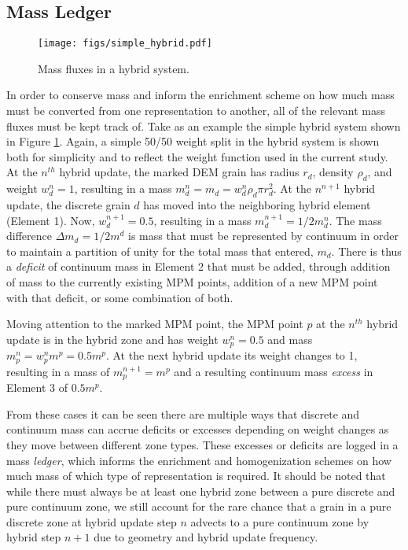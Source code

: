 \subsection{Mass Ledger}

\begin{figure}[htp] 
    \centering
    \texttt{[image: figs/simple\_hybrid.pdf]}
    \caption{Mass fluxes in a hybrid system.}
    \label{mass_ledger_schematic}
\end{figure}

In order to conserve mass and inform the enrichment scheme on how much mass must be converted from one representation to another, all of the relevant mass fluxes must be kept track of. Take as an example the simple hybrid system shown in Figure \ref{mass_ledger_schematic}. Again, a simple 50/50 weight split in the hybrid system is shown both for simplicity and to reflect the weight function used in the current study. At the $n^{th}$ hybrid update, the marked DEM grain has radius $r_d$, density $\rho_d$, and weight $w^n_d=1$, resulting in a mass $m^n_d=m_d=w^n_d\rho_d\pi r^2_d$. At the $n^{n+1}$ hybrid update, the discrete grain $d$ has moved into the neighboring hybrid element (Element 1). Now, $w^{n+1}_d=0.5$, resulting in a mass $m^{n+1}_d=1/2m^{n}_d$. The mass difference $\Delta m_d=1/2m^d$ is mass that must be represented by continuum in order to maintain a partition of unity for the total mass that entered, $m_d$. There is thus a \textit{deficit} of continuum mass in Element 2 that must be added, through addition of mass to the currently existing MPM points, addition of a new MPM point with that deficit, or some combination of both.

Moving attention to the marked MPM point, the MPM point $p$ at the $n^{th}$ hybrid update is in the hybrid zone and has weight $w^n_p=0.5$ and mass $m^n_p=w^n_p m^p=0.5m^p$. At the next hybrid update its weight changes to 1, resulting in a mass of $m^{n+1}_p=m^p$ and a resulting continuum mass \textit{excess} in Element 3 of $0.5m^p$. 

From these cases it can be seen there are multiple ways that discrete and continuum mass can accrue deficits or excesses depending on weight changes as they move between different zone types. These excesses or deficits are logged in a mass \textit{ledger}, which informs the enrichment and homogenization schemes on how much mass of which type of representation is required. It should be noted that while there must always be at least one hybrid zone between a pure discrete and pure continuum zone, we still account for the rare chance that a grain in a pure discrete zone at hybrid update step $n$ advects to a pure continuum zone by hybrid step $n+1$ due to geometry and hybrid update frequency.

